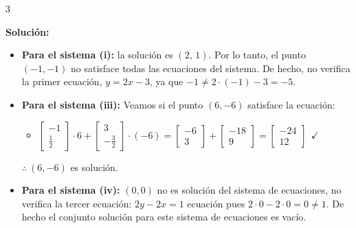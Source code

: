 \documentclass[11pt]{article}
\begin{document}
\begin{enumerate}[\hspace{-5mm} 1) ]
\begin{enumerate}[a)]
\begin{enumerate}[a)]
\begin{itemize}
\begin{multicols}{3}
    \end{multicols}
    \end{itemize}



    {\bf Solución:} 

    \begin{itemize}
\item \textbf{Para el sistema (i):} la solución es $\left(2,\, 1\right)$. Por lo tanto, el punto $(-1, -1)$ no satisface todas las ecuaciones del sistema. De hecho, no verifica la primer ecuación, $y = 2x-3$, \linebreak
 ya que $-1 \neq 2\cdot (-1) -3 = -5$.





\item \textbf{Para el sistema (iii):}  Veamos si el punto $(6, -6)$  satisface  la ecuación: 

\begin{itemize}
    \item  $\begin{bmatrix} -1 \\ \tfrac{1}{2} \end{bmatrix} \cdot 6
        +
        \begin{bmatrix}3 \\ -\tfrac{3}{2} \end{bmatrix} \cdot (-6)
        = 
        \begin{bmatrix} -6 \\ 3 \end{bmatrix}  
        +
        \begin{bmatrix} -18 \\  9\end{bmatrix} 
        = 
        \begin{bmatrix} -24 \\ 12 \end{bmatrix}  \ \ \checkmark$   
\end{itemize}

$\therefore \ (6,-6)$ es solución.
\vspace{9mm}

 
\item \textbf{Para el sistema (iv):}  $(0, 0)$ no es solución del sistema de ecuaciones, no verifica la tercer ecuación:  $ 2y -2x= 1 $ ecuación pues  $2 \cdot 0 -2 \cdot 0  = 0 \neq 1 $. De hecho el conjunto solución para este sistema de ecuaciones es vacío.
\end{itemize}
\end{enumerate}
















\end{enumerate}
\end{enumerate}
\end{document}
